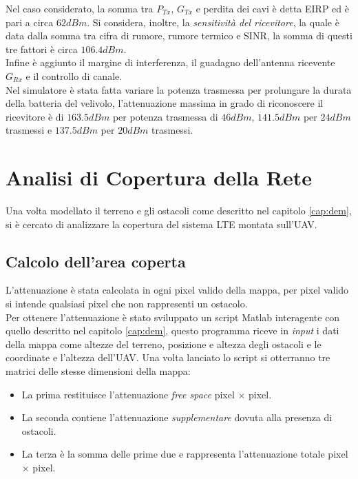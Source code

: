 Nel caso considerato, la somma tra $P_{Tx}$, $G_{Tx}$ e perdita dei cavi è detta \ac{EIRP} ed è pari a circa $62 dBm$. Si considera, inoltre,
la \emph{sensitività del ricevitore}, la quale è data dalla somma tra cifra di rumore, rumore termico e \ac{SINR}, la somma di questi
tre fattori è circa $106.4 dBm$. \\
Infine è aggiunto il margine di interferenza, il guadagno dell'antenna ricevente $G_{Rx}$ e il controllo di canale. \\
Nel simulatore è stata fatta variare la potenza trasmessa per prolungare la durata della batteria del velivolo, l'attenuazione massima 
in grado di riconoscere il ricevitore è di $163.5 dBm$ per potenza trasmessa di $46 dBm$, $141.5 dBm$ per $24 dBm$ trasmessi e $137.5 dBm$
per $20 dBm$ trasmessi.

\section{Analisi di Copertura della Rete}
\label{cap:copertura}
Una volta modellato il terreno e gli ostacoli come descritto nel capitolo \ref{cap:dem}, si è cercato di analizzare la copertura 
del sistema \ac{LTE} montata sull'\ac{UAV}.

\subsection{Calcolo dell'area coperta}
L'attenuazione è stata calcolata in ogni pixel valido della mappa, per pixel valido si intende qualsiasi pixel che non rappresenti un 
ostacolo. \\
Per ottenere l'attenuazione è stato sviluppato un script Matlab interagente con quello descritto nel capitolo \ref{cap:dem}, questo 
programma riceve in \emph{input} i dati della mappa come altezze del terreno, posizione e altezza degli ostacoli e le coordinate e l'altezza
dell'\ac{UAV}. Una volta lanciato lo script si otterranno tre matrici delle stesse dimensioni della mappa:
\begin{itemize}
\item La prima restituisce l'attenuazione \emph{free space} pixel $\times$ pixel.
\item La seconda contiene l'attenuazione \emph{supplementare} dovuta alla presenza di ostacoli.
\item La terza è la somma delle prime due e rappresenta l'attenuazione totale pixel $\times$ pixel.
\end{itemize}

